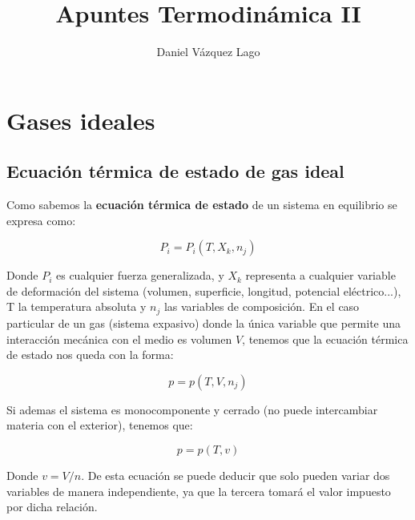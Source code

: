 \documentclass[12pt,a4paper]{article}
\author{Daniel Vázquez Lago}
\title{Apuntes Termodinámica II}
\begin{document}
\newcommand{\parentesis}[1]{\left( #1  \right)}
\newcommand{\parciales}[2]{\frac{\partial #1}{\partial #2}}
\newcommand{\pparciales}[2]{\parentesis{\parciales{#1}{#2}}}
\newcommand{\D}{\mathrm{d}}
\newcommand{\corchetes}[1]{\left{ #1  \right} }
\newcommand{\ccorchetes}[1]{\left[ #1  \right]}
\newcommand{\cte}{\mathrm{cte}}

\maketitle

\newpage

\tableofcontents

\newpage

\section{Gases ideales}

\subsection{Ecuación térmica de estado de gas ideal}

Como sabemos la \textbf{ecuación térmica de estado} de un sistema en equilibrio se expresa como:

\begin{equation}
P_i = P_i (T, X_k, n_j)
\end{equation}

Donde $P_i$ es cualquier fuerza generalizada, y $X_k$ representa a cualquier variable de deformación del sistema (volumen, superficie, longitud, potencial eléctrico...), T la temperatura absoluta y $n_j$ las variables de composición. En el caso particular de un gas (sistema expasivo) donde la única variable que permite una interacción mecánica con el medio es volumen $V$, tenemos que la ecuación térmica de estado nos queda con la forma:

\begin{equation}
p = p(T,V,n_j)
\end{equation}

Si ademas el sistema es monocomponente y cerrado (no puede intercambiar materia con el exterior), tenemos que:

\begin{equation}
p = p(T,v)
\end{equation}

Donde $v=V/n$. De esta ecuación se puede deducir que solo pueden variar dos variables de manera independiente, ya que la tercera tomará el valor impuesto por dicha relación. \\
\end{document}
